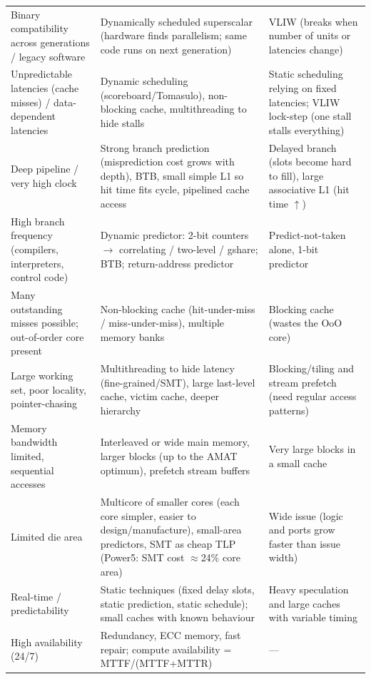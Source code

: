 \begin{longtable}{L{3.6cm}L{6.3cm}L{6.4cm}}
\addlinespace
Binary compatibility across generations / legacy software &
Dynamically scheduled superscalar (hardware finds parallelism; same code runs on next generation) &
VLIW (breaks when number of units or latencies change) \\
\addlinespace
Unpredictable latencies (cache misses) / data-dependent latencies &
Dynamic scheduling (scoreboard/Tomasulo), non-blocking cache, multithreading to hide stalls &
Static scheduling relying on fixed latencies; VLIW lock-step (one stall stalls everything) \\
\addlinespace
Deep pipeline / very high clock &
Strong branch prediction (misprediction cost grows with depth), BTB, small simple L1 so hit time fits cycle, pipelined cache access &
Delayed branch (slots become hard to fill), large associative L1 (hit time $\uparrow$) \\
\addlinespace
High branch frequency (compilers, interpreters, control code) &
Dynamic predictor: 2-bit counters $\rightarrow$ correlating / two-level / gshare; BTB; return-address predictor &
Predict-not-taken alone, 1-bit predictor \\
\addlinespace
Many outstanding misses possible; out-of-order core present &
Non-blocking cache (hit-under-miss / miss-under-miss), multiple memory banks &
Blocking cache (wastes the OoO core) \\
\addlinespace
Large working set, poor locality, pointer-chasing &
Multithreading to hide latency (fine-grained/SMT), large last-level cache, victim cache, deeper hierarchy &
Blocking/tiling and stream prefetch (need regular access patterns) \\
\addlinespace
Memory bandwidth limited, sequential accesses &
Interleaved or wide main memory, larger blocks (up to the AMAT optimum), prefetch stream buffers &
Very large blocks in a small cache \\
\addlinespace
Limited die area &
Multicore of smaller cores (each core simpler, easier to design/manufacture), small-area predictors, SMT as cheap TLP (Power5: SMT cost $\approx$24\% core area) &
Wide issue (logic and ports grow faster than issue width) \\
\addlinespace
Real-time / predictability &
Static techniques (fixed delay slots, static prediction, static schedule); small caches with known behaviour\bs{} &
Heavy speculation and large caches with variable timing\bs{} \\
\addlinespace
High availability (24/7) &
Redundancy, ECC memory, fast repair; compute availability = MTTF/(MTTF+MTTR) &
--- \\
\bottomrule
\end{longtable}
\normalsize

